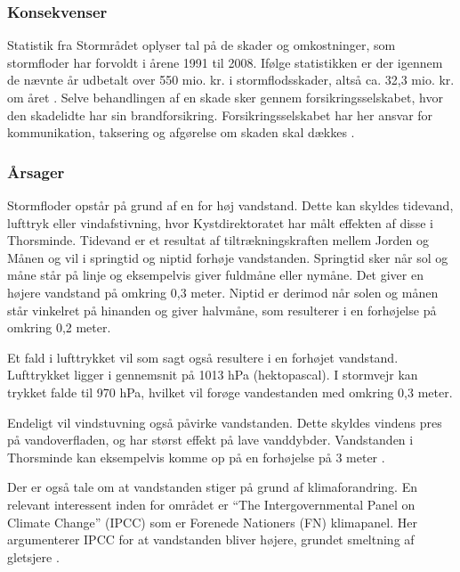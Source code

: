 \subsubsection{Konsekvenser}
Statistik fra Stormrådet oplyser tal på de skader og omkostninger, som stormfloder har forvoldt i årene 1991 til 2008. Ifølge statistikken er der igennem de nævnte år udbetalt over 550 mio. kr. i stormflodsskader, altså ca. 32,3 mio. kr. om året \cite{3b}.
Selve behandlingen af en skade sker gennem forsikringsselskabet, hvor den skadelidte har sin brandforsikring. Forsikringsselskabet har her ansvar for kommunikation, taksering og afgørelse om skaden skal dækkes \cite{3c}.

\subsubsection{Årsager}
Stormfloder opstår på grund af en for høj vandstand. Dette kan skyldes tidevand, lufttryk eller vindafstivning, hvor Kystdirektoratet har målt effekten af disse i Thorsminde. Tidevand er et resultat af tiltrækningskraften mellem Jorden og Månen og vil i springtid og niptid forhøje vandstanden. Springtid sker når sol og måne står på linje og eksempelvis giver fuldmåne eller nymåne. Det giver en højere vandstand på omkring 0,3 meter. Niptid er derimod når solen og månen står vinkelret på hinanden og giver halvmåne, som resulterer i en forhøjelse på omkring 0,2 meter. 
\par 
Et fald i lufttrykket vil som sagt også resultere i en forhøjet vandstand. Lufttrykket ligger i gennemsnit på 1013 hPa (hektopascal). I stormvejr kan trykket falde til 970 hPa, hvilket vil forøge vandestanden med omkring 0,3 meter. 
\par 
Endeligt vil vindstuvning også påvirke vandstanden. Dette skyldes vindens pres på vandoverfladen, og har størst effekt på lave vanddybder. Vandstanden i Thorsminde kan eksempelvis komme op på en forhøjelse på 3 meter \cite{3d}.
\par
Der er også tale om at vandstanden stiger på grund af klimaforandring. En relevant interessent inden for området er “The Intergovernmental Panel on Climate Change” (IPCC) som er Forenede Nationers (FN) klimapanel. Her argumenterer IPCC for at vandstanden bliver højere, grundet smeltning af gletsjere \cite{3e}.
